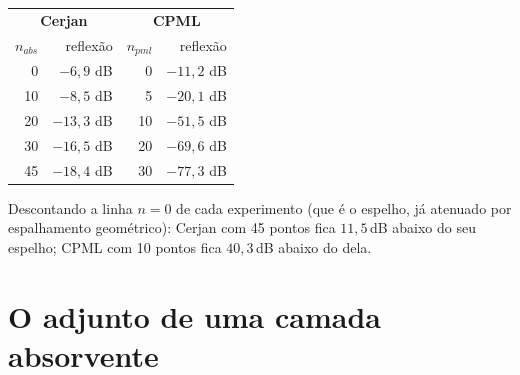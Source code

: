 \documentclass[11pt,a4paper,oneside]{report}
\begin{document}
\begin{center}
\begin{tabular}{@{}rrrr@{}}
\toprule
\multicolumn{2}{c}{\textbf{Cerjan}} & \multicolumn{2}{c}{\textbf{CPML}} \\
$n_{abs}$ & reflex\~ao & $n_{pml}$ & reflex\~ao \\
\midrule
0  & $-6{,}9$ dB  & 0  & $-11{,}2$ dB \\
10 & $-8{,}5$ dB  & 5  & $-20{,}1$ dB \\
20 & $-13{,}3$ dB & 10 & $-51{,}5$ dB \\
30 & $-16{,}5$ dB & 20 & $-69{,}6$ dB \\
45 & $-18{,}4$ dB & 30 & $-77{,}3$ dB \\
\bottomrule
\end{tabular}
\end{center}

Descontando a linha $n=0$ de cada experimento (que \'e o espelho, j\'a
atenuado por espalhamento geom\'etrico): Cerjan com 45 pontos fica
$11{,}5$\,dB abaixo do seu espelho; CPML com 10 pontos fica $40{,}3$\,dB
abaixo do dela.

\section{O adjunto de uma camada absorvente}
\end{document}

